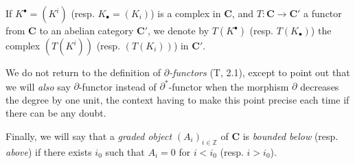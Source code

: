 \begin{env}[11.2.1]
If $K^\bullet=(K^i)$ (resp. $K_\bullet=(K_i)$) is a complex in
$\boldsymbol{C}$, and $T:\boldsymbol{C}\to\boldsymbol{C}'$ a functor from $\boldsymbol{C}$
to an abelian category $\boldsymbol{C}'$, we denote by
$T(K^\bullet)$ (resp. $T(K_\bullet)$) the complex $(T(K^i))$ (resp.
$(T(K_i))$) in $\boldsymbol{C}'$.

We do not return to the definition of \emph{$\partial$-functors} (T, 2.1),
except to point out that we will \emph{also} say $\partial$-functor instead of
$\partial^*$-functor when the morphism $\partial$ decreases the degree by one
unit, the context having to make this point precise each time if there can be any
doubt.

Finally, we will say that a \emph{graded object} $(A_i)_{i\in\mathbb Z}$ of
$\boldsymbol{C}$ is \emph{bounded below} (resp. \emph{above})
if there exists $i_0$ such that $A_i=0$ for $i<i_0$ (resp. $i>i_0$).
\end{env}

